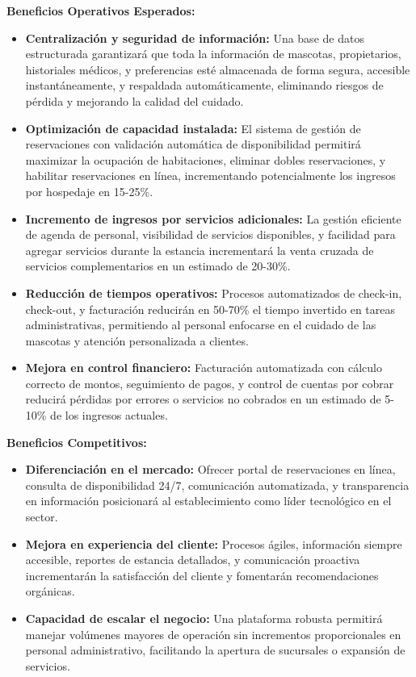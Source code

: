 	\textbf{Beneficios Operativos Esperados:}
	
	\begin{itemize}
		\item \textbf{Centralización y seguridad de información:} Una base de datos estructurada garantizará que toda la información de mascotas, propietarios, historiales médicos, y preferencias esté almacenada de forma segura, accesible instantáneamente, y respaldada automáticamente, eliminando riesgos de pérdida y mejorando la calidad del cuidado.
		
		\item \textbf{Optimización de capacidad instalada:} El sistema de gestión de reservaciones con validación automática de disponibilidad permitirá maximizar la ocupación de habitaciones, eliminar dobles reservaciones, y habilitar reservaciones en línea, incrementando potencialmente los ingresos por hospedaje en 15-25\%.
		
		\item \textbf{Incremento de ingresos por servicios adicionales:} La gestión eficiente de agenda de personal, visibilidad de servicios disponibles, y facilidad para agregar servicios durante la estancia incrementará la venta cruzada de servicios complementarios en un estimado de 20-30\%.
		
		\item \textbf{Reducción de tiempos operativos:} Procesos automatizados de check-in, check-out, y facturación reducirán en 50-70\% el tiempo invertido en tareas administrativas, permitiendo al personal enfocarse en el cuidado de las mascotas y atención personalizada a clientes.
		
		\item \textbf{Mejora en control financiero:} Facturación automatizada con cálculo correcto de montos, seguimiento de pagos, y control de cuentas por cobrar reducirá pérdidas por errores o servicios no cobrados en un estimado de 5-10\% de los ingresos actuales.
	\end{itemize}
	
	\textbf{Beneficios Competitivos:}
	
	\begin{itemize}
		\item \textbf{Diferenciación en el mercado:} Ofrecer portal de reservaciones en línea, consulta de disponibilidad 24/7, comunicación automatizada, y transparencia en información posicionará al establecimiento como líder tecnológico en el sector.
		
		\item \textbf{Mejora en experiencia del cliente:} Procesos ágiles, información siempre accesible, reportes de estancia detallados, y comunicación proactiva incrementarán la satisfacción del cliente y fomentarán recomendaciones orgánicas.
		
		\item \textbf{Capacidad de escalar el negocio:} Una plataforma robusta permitirá manejar volúmenes mayores de operación sin incrementos proporcionales en personal administrativo, facilitando la apertura de sucursales o expansión de servicios.
	\end{itemize}
	
